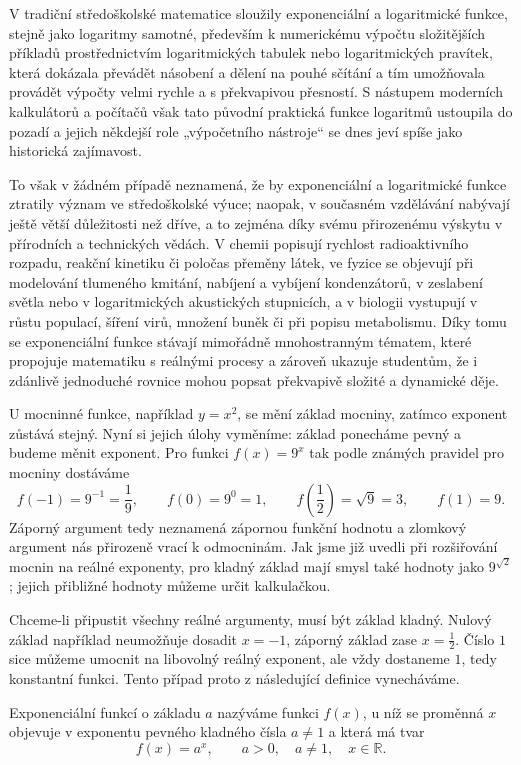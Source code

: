 \documentclass[12pt,a4paper]{article}
\begin{document}
V tradiční středoškolské matematice sloužily exponenciální a logaritmické funkce,
stejně jako logaritmy samotné,
především k numerickému výpočtu složitějších příkladů prostřednictvím logaritmických tabulek
nebo logaritmických pravítek, která dokázala převádět násobení a dělení na pouhé sčítání
a tím umožňovala provádět výpočty velmi rychle a s překvapivou přesností.
S nástupem moderních kalkulátorů a počítačů však tato původní praktická funkce logaritmů
ustoupila do pozadí a jejich někdejší role „výpočetního nástroje“ se dnes jeví spíše jako historická zajímavost.

To však v žádném případě neznamená, že by exponenciální a logaritmické funkce ztratily význam ve středoškolské výuce;
naopak, v současném vzdělávání nabývají ještě větší důležitosti než dříve,
a to zejména díky svému přirozenému výskytu v přírodních a technických vědách.
V chemii popisují rychlost radioaktivního rozpadu, reakční kinetiku či poločas přeměny látek,
ve fyzice se objevují při modelování tlumeného kmitání, nabíjení a vybíjení kondenzátorů,
v zeslabení světla nebo v logaritmických akustických stupnicích,
a v biologii vystupují v růstu populací, šíření virů, množení buněk či při popisu metabolismu.
Díky tomu se exponenciální funkce stávají mimořádně mnohostranným tématem,
které propojuje matematiku s reálnými procesy a zároveň ukazuje studentům,
že i zdánlivě jednoduché rovnice mohou popsat překvapivě složité a dynamické děje.



U mocninné funkce, například $y=x^2$, se mění základ mocniny, zatímco exponent zůstává stejný.
Nyní si jejich úlohy vyměníme: základ ponecháme pevný a budeme měnit exponent.
Pro funkci $f(x)=9^x$ tak podle známých pravidel pro mocniny dostáváme
\[
    f(-1)=9^{-1}=\frac19,\qquad
    f(0)=9^0=1,\qquad
    f\left(\frac12\right)=\sqrt9=3,\qquad
    f(1)=9.
\]
Záporný argument tedy neznamená zápornou funkční hodnotu a zlomkový argument nás přirozeně vrací k odmocninám.
Jak jsme již uvedli při rozšiřování mocnin na reálné exponenty, pro kladný základ mají smysl také hodnoty jako $9^{\sqrt2}$;
jejich přibližné hodnoty můžeme určit kalkulačkou.

Chceme-li připustit všechny reálné argumenty, musí být základ kladný.
Nulový základ například neumožňuje dosadit $x=-1$, záporný základ zase $x=\frac12$.
Číslo $1$ sice můžeme umocnit na libovolný reálný exponent, ale vždy dostaneme $1$,
tedy konstantní funkci. Tento případ proto z následující definice vynecháváme.

\begin{definitionbox}
Exponenciální funkcí o základu $a$ nazýváme funkci $f(x)$,
u níž se proměnná $x$ objevuje v exponentu pevného kladného čísla $a\neq1$ a která má tvar
\[
    f(x) = a^{x},\qquad a>0,\quad a\neq1,\quad x\in\mathbb{R}.
\]
\end{definitionbox}
\end{document}
